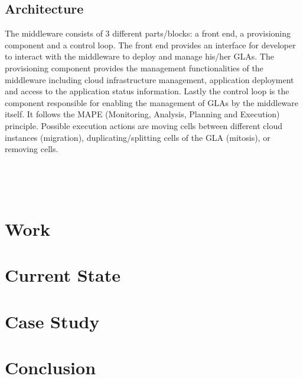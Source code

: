 \documentclass{seal_thesis}
\begin{document}
\section{Architecture}
The middleware consists of 3 different parts/blocks: a front end, a provisioning component and a control loop.
The front end provides an interface for developer to interact with the middleware to deploy and manage his/her GLAs.
The provisioning component provides the management functionalities of the middleware including cloud infrastructure management, application deployment and access to the application status information.
Lastly the control loop is the component responsible for enabling the management of GLAs by the middleware itself.
It follows the MAPE (Monitoring, Analysis, Planning and Execution) principle.
Possible execution actions are moving cells between different cloud instances (migration), duplicating/splitting cells of the GLA (mitosis), or removing cells.

\hfill \\

\noindent{}
\hfill \\



\chapter{Work}

\chapter{Current State}

\chapter{Case Study}

\chapter{Conclusion}



\end{document}

